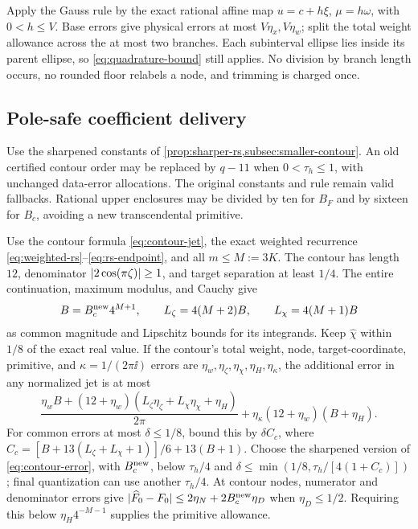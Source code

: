 Apply the Gauss rule by the exact rational affine map
\(u=c+h\xi\), \(\mu=h\omega\), with \(0<h\le V\).
Base errors give physical errors at most \(V\eta_x,V\eta_w\);
split the total weight allowance across the at most two branches.
Each subinterval ellipse lies inside its parent ellipse, so
\eqref{eq:quadrature-bound} still applies. No division by branch length
occurs, no rounded floor relabels a node, and trimming is charged once.

\subsection{Pole-safe coefficient delivery}
Use the sharpened constants of \cref{prop:sharper-rs,subsec:smaller-contour}.
An old certified contour order may be replaced by \(q-11\) when
\(0<\tau_h\le1\), with unchanged data-error allocations.
The original constants and rule remain valid fallbacks. Rational upper
enclosures may be divided by ten for \(B_F\) and by sixteen for
\(B_c\), avoiding a new transcendental primitive.

\label{subsec:pole-safe-delivery}
Use the contour formula \eqref{eq:contour-jet}, the exact weighted
recurrence \eqref{eq:weighted-rs}--\eqref{eq:rs-endpoint}, and all
\(m\le M:=3K\). The contour has length \(12\), denominator
\(\lvert 2\cos(\pi\zeta)\rvert\ge1\), and target separation at least
\(1/4\). The entire continuation, maximum modulus, and Cauchy give
\[
 B=B_c^{\rm new}4^{M+1},\qquad L_\zeta=4(M+2)B,\qquad L_\chi=4(M+1)B
\]
as common magnitude and Lipschitz bounds for its integrands.
Keep \(\widehat\chi\) within \(1/8\) of the exact real value.
If the contour's total weight, node, target-coordinate, primitive, and
\(\kappa=1/(2\pi\ii)\) errors are
\(\eta_w,\eta_\zeta,\eta_\chi,\eta_H,\eta_\kappa\), the additional
error in any normalized jet is at most
\begin{equation}
 \frac{\eta_wB+(12+\eta_w)
       (L_\zeta\eta_\zeta+L_\chi\eta_\chi+\eta_H)}{2\pi}
 +\eta_\kappa(12+\eta_w)(B+\eta_H).
 \label{eq:contour-delivery}
\end{equation}
For common errors at most \(\delta\le1/8\), bound this by
\(\delta C_c\), where
\(C_c=[B+13(L_\zeta+L_\chi+1)]/6+13(B+1)\).
Choose the sharpened version of \eqref{eq:contour-error}, with
\(B_c^{\rm new}\), below \(\tau_h/4\) and
\(\delta\le\min(1/8,\tau_h/[4(1+C_c)])\); final quantization can
use another \(\tau_h/4\). At contour nodes, numerator and denominator
errors give \(\lvert \widehat F_0-F_0\rvert\le2\eta_N+2B_c^{\rm new}\eta_D\)
when \(\eta_D\le1/2\). Requiring this below
\(\eta_H4^{-M-1}\) supplies the primitive allowance.

